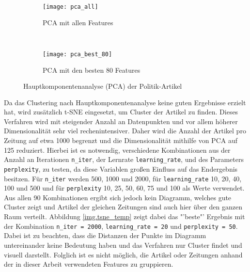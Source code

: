 \begin{figure}
  \centering
  \begin{subfigure}[b]{0.49\textwidth}
      \texttt{[image: pca\_all]}
      \caption{PCA mit allen Features}
      \label{fig:pca_all}
  \end{subfigure}
  ~ %
  \begin{subfigure}[b]{0.49\textwidth}
      \texttt{[image: pca\_best\_80]}
      \caption{PCA mit den besten 80 Features}
      \label{fig:pca_best_80}
  \end{subfigure}
  \caption{Hauptkomponentenanalyse (PCA) der Politik-Artikel}\label{fig:pca}
\end{figure}

Da das Clustering nach Hauptkomponentenanalyse keine guten Ergebnisse erzielt hat, wird zusätzlich t-SNE eingesetzt, um Cluster der Artikel zu finden. Dieses Verfahren wird mit steigender Anzahl an Datenpunkten und vor allem höherer Dimensionalität sehr viel rechenintensiver. Daher wird die Anzahl der Artikel pro Zeitung auf etwa 1000 begrenzt und die Dimensionalität mithilfe von PCA auf 125 reduziert. Hierbei ist es notwendig, verschiedene Kombinationen aus der Anzahl an Iterationen \texttt{n\_iter}, der Lernrate \texttt{learning\_rate}, und des Parameters \texttt{perplexity}, zu testen, da diese Variablen großen Einfluss auf das Endergebnis besitzen. Für \texttt{n\_iter} werden 500, 1000 und 2000, für \texttt{learning\_rate} 10, 20, 40, 100 und 500 und für \texttt{perplexity} 10, 25, 50, 60, 75 und 100 als Werte verwendet. Aus allen 90 Kombinationen ergibt sich jedoch kein Diagramm, welches gute Cluster zeigt und Artikel der gleichen Zeitungen sind auch hier über den ganzen Raum verteilt. Abbildung \ref{img.tsne_temp} zeigt dabei das "'beste"' Ergebnis mit der Kombination \texttt{n\_iter = 2000}, \texttt{learning\_rate = 20} und \texttt{perplexity = 50}. Dabei ist zu beachten, dass die Distanzen der Punkte im Diagramm untereinander keine Bedeutung haben und das Verfahren nur Cluster findet und visuell darstellt. Folglich ist es nicht möglich, die Artikel oder Zeitungen anhand der in dieser Arbeit verwendeten Features zu gruppieren.


